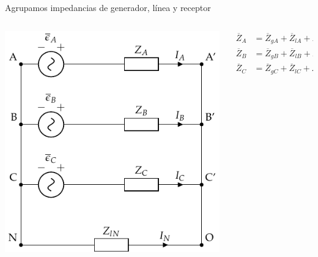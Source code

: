 \documentclass[aspectratio=169, usenames,svgnames,dvipsnames]{beamer}
\begin{document}
\begin{frame}[label={sec:orgb2f53a2}]{Agrupamos impedancias de generador, línea y receptor}
\begin{columns}
\begin{column}{0.7\columnwidth}
\begin{center}
\includegraphics[height=0.9\textheight]{../figs/CircuitoTrifasicaGeneralizado2.pdf}
\end{center}
\end{column}

\begin{column}{0.3\columnwidth}
\begin{align*}
  \overline{Z}_A &= \overline{Z}_{gA} + \overline{Z}_{lA} + \overline{Z}_{cA}\\
  \overline{Z}_B &= \overline{Z}_{gB} + \overline{Z}_{lB} + \overline{Z}_{cB}\\
  \overline{Z}_C &= \overline{Z}_{gC} + \overline{Z}_{lC} + \overline{Z}_{cC}
\end{align*}
\end{column}
\end{columns}
\end{frame}
\end{document}
